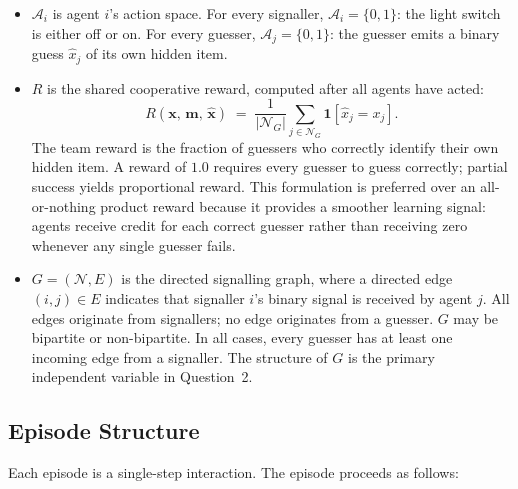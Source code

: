 \documentclass[a4paper,twoside,12pt]{report}
\begin{document}
\begin{itemize}
        \item $\mathcal{A}_i$ is agent $i$'s action space. For every signaller,
        $\mathcal{A}_i = \{0, 1\}$: the light switch is either off or on. For
        every guesser, $\mathcal{A}_j = \{0, 1\}$: the guesser emits a binary
        guess $\hat{x}_j$ of its own hidden item.
    
        \item $R$ is the shared cooperative reward, computed after all agents
        have acted:
        \begin{equation}
            R\!\left(\mathbf{x},\, \mathbf{m},\, \hat{\mathbf{x}}\right)
            \;=\;
            \frac{1}{|\mathcal{N}_G|}
            \sum_{j \in \mathcal{N}_G}
            \mathbf{1}\!\left[\hat{x}_j = x_j\right].
        \end{equation}
        The team reward is the fraction of guessers who correctly identify their
        own hidden item. A reward of $1.0$ requires every guesser to guess
        correctly; partial success yields proportional reward. This formulation
        is preferred over an all-or-nothing product reward because it provides a
        smoother learning signal: agents receive credit for each correct guesser
        rather than receiving zero whenever any single guesser fails.
    
        \item $G = (\mathcal{N}, E)$ is the directed signalling graph, where a
        directed edge $(i, j) \in E$ indicates that signaller $i$'s binary
        signal is received by agent $j$. All edges originate from signallers;
        no edge originates from a guesser. $G$ may be bipartite or
        non-bipartite. In all cases, every guesser has at least
        one incoming edge from a signaller. The structure of $G$ is the primary
        independent variable in Question~2.
    
    \end{itemize}
    
    \subsection{Episode Structure}
    
    Each episode is a single-step interaction. The episode proceeds as follows:
    
\end{document}

